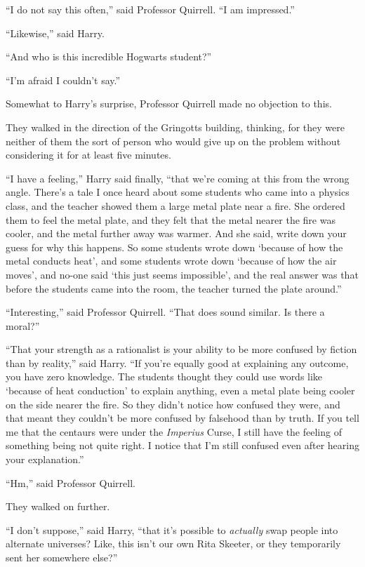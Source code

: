 “I do not say this often,” said Professor Quirrell. “I am impressed.”

“Likewise,” said Harry.

“And who is this incredible Hogwarts student?”

“I’m afraid I couldn’t say.”

Somewhat to Harry’s surprise, Professor Quirrell made no objection to this.

They walked in the direction of the Gringotts building, thinking, for they were neither of them the sort of person who would give up on the problem without considering it for at least five minutes.

“I have a feeling,” Harry said finally, “that we’re coming at this from the wrong angle. There’s a tale I once heard about some students who came into a physics class, and the teacher showed them a large metal plate near a fire. She ordered them to feel the metal plate, and they felt that the metal nearer the fire was cooler, and the metal further away was warmer. And she said, write down your guess for why this happens. So some students wrote down ‘because of how the metal conducts heat’, and some students wrote down ‘because of how the air moves’, and no-one said ‘this just seems impossible’, and the real answer was that before the students came into the room, the teacher turned the plate around.”

“Interesting,” said Professor Quirrell. “That does sound similar. Is there a moral?”

“That your strength as a rationalist is your ability to be more confused by fiction than by reality,” said Harry. “If you’re equally good at explaining any outcome, you have zero knowledge. The students thought they could use words like ‘because of heat conduction’ to explain anything, even a metal plate being cooler on the side nearer the fire. So they didn’t notice how confused they were, and that meant they couldn’t be more confused by falsehood than by truth. If you tell me that the centaurs were under the \emph{Imperius} Curse, I still have the feeling of something being not quite right. I notice that I’m still confused even after hearing your explanation.”

“Hm,” said Professor Quirrell.

They walked on further.

“I don’t suppose,” said Harry, “that it’s possible to \emph{actually} swap people into alternate universes? Like, this isn’t our own Rita Skeeter, or they temporarily sent her somewhere else?”

